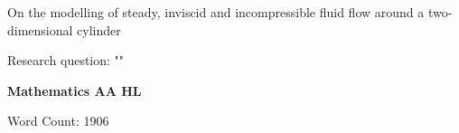 \begin{titlepage}
	\begin{center}
		\vspace*{2cm}
		\Large On the modelling of steady, inviscid and incompressible fluid flow around a two-dimensional cylinder

		\vspace{1.5cm}
		\normalsize Research question: "\textbf{\researchquestion}"

		\vspace{1.5cm}
		\large\textbf{Mathematics AA HL}

		\vfill
		\color{darkgray} Word Count: 1906
	\end{center}
\end{titlepage}

\tableofcontents\newpage